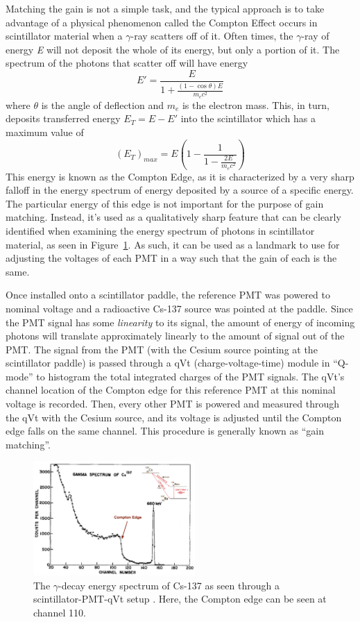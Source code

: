 Matching the gain is not a simple task, and the typical approach is to take advantage of a physical phenomenon called the Compton Effect occurs in scintillator material when a $\gamma$-ray scatters off of it. Often times, the $\gamma$-ray of energy \emph{E} will not deposit the whole of its energy, but only a portion of it. The spectrum of the photons that scatter off will have energy
\begin{equation}
E' = \frac{E}{1 + \frac{(1-\cos \theta) E}{m_e c^2}}
\end{equation}
where $\theta$ is the angle of deflection and $m_e$ is the electron mass. This, in turn, deposits transferred energy $E_T = E - E'$ into the scintillator which has a maximum value of
\begin{equation}
(E_T)_{max} = E \left( 1 - \frac{1}{1-\frac{2 E}{m_e c^2}} \right)
\end{equation}
This energy is known as the Compton Edge, as it is characterized by a very sharp falloff in the energy spectrum of energy deposited by a source of a specific energy. The particular energy of this edge is not important for the purpose of gain matching. Instead, it's used as a qualitatively sharp feature that can be clearly identified when examining the energy spectrum of photons in scintillator material, as seen in Figure~\ref{fig:cs-137}. As such, it can be used as a landmark to use for adjusting the voltages of each PMT in a way such that the gain of each is the same.

Once installed onto a scintillator paddle, the reference PMT was powered to nominal voltage and a radioactive Cs-137 source was pointed at the paddle. Since the PMT signal has some \emph{linearity} to its signal, the amount of energy of incoming photons will translate approximately linearly to the amount of signal out of the PMT. The signal from the PMT (with the Cesium source pointing at the scintillator paddle) is passed through a qVt (charge-voltage-time) module in ``Q-mode'' to histogram the total integrated charges of the PMT signals. The qVt's channel location of the Compton edge for this reference PMT at this nominal voltage is recorded. Then, every other PMT is powered and measured through the qVt with the Cesium source, and its voltage is adjusted until the Compton edge falls on the same channel. This procedure is generally known as ``gain matching''.

\begin{figure}
	\centerline{
		\mbox{\includegraphics[width=0.55\textwidth]{figures/cs-137.pdf}}
	}
	\caption{The $\gamma$-decay energy spectrum of Cs-137 as seen through a scintillator-PMT-qVt setup \cite{Webb_Williams_1963}. Here, the Compton edge can be seen at channel 110.}
	\label{fig:cs-137}
\end{figure}
